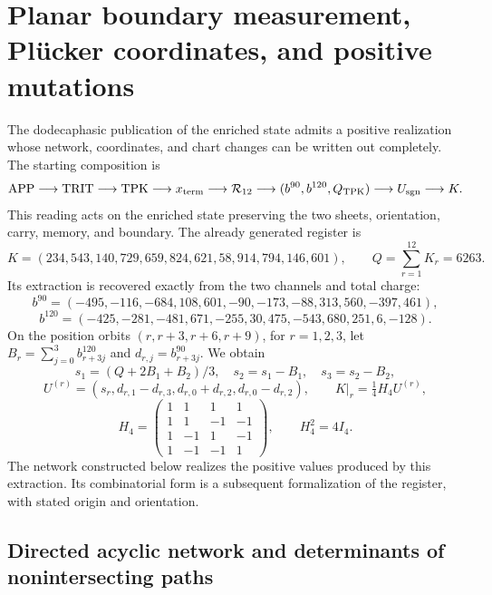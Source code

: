 \section{Planar boundary measurement, Plücker coordinates, and positive mutations}
\label{app:network-cluster}

The dodecaphasic publication of the enriched state admits a positive
realization whose network, coordinates, and chart changes can be written
out completely. The starting composition is
\[
 \mathrm{APP}\longrightarrow\mathrm{TRIT}\longrightarrow\mathrm{TPK}
 \longrightarrow x_{\rm term}\longrightarrow\mathcal R_{12}
 \longrightarrow(b^{90},b^{120},Q_{\rm TPK})
 \longrightarrow U_{\rm sgn}\longrightarrow K.
\]
This reading acts on the enriched state preserving the two sheets,
orientation, carry, memory, and boundary. The already generated register is
\[
 K=(234,543,140,729,659,824,621,58,914,794,146,601),
 \qquad Q=\sum_{r=1}^{12}K_r=6263.
\]
Its extraction is recovered exactly from the two channels and total charge:
\[
 b^{90}=(-495,-116,-684,108,601,-90,-173,-88,313,560,-397,461),
\]
\[
 b^{120}=(-425,-281,-481,671,-255,30,475,-543,680,251,6,-128).
\]
On the position orbits \((r,r+3,r+6,r+9)\), for \(r=1,2,3\),
let \(B_r=\sum_{j=0}^3b^{120}_{r+3j}\) and
\(d_{r,j}=b^{90}_{r+3j}\). We obtain
\[
 s_1=(Q+2B_1+B_2)/3,\quad s_2=s_1-B_1,\quad s_3=s_2-B_2,
\]
\[
 U^{(r)}=(s_r,d_{r,1}-d_{r,3},d_{r,0}+d_{r,2},d_{r,0}-d_{r,2}),
 \qquad K|_r=\tfrac14H_4U^{(r)},
\]
\[
 H_4=\begin{pmatrix}1&1&1&1\\1&1&-1&-1\\1&-1&1&-1\\1&-1&-1&1\end{pmatrix},
 \qquad H_4^2=4I_4.
\]
The network constructed below realizes the positive values produced by
this extraction. Its combinatorial form is a subsequent formalization
of the register, with stated origin and orientation.

\subsection{Directed acyclic network and determinants of nonintersecting paths}

